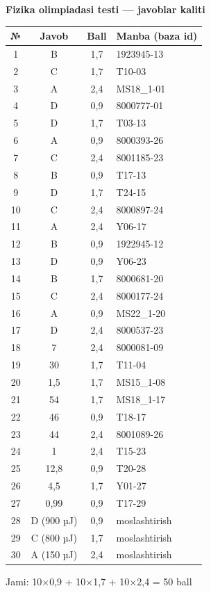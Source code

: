 \documentclass[11pt,a4paper]{article}
\begin{document}
\begin{center}{\Large\textbf{Fizika olimpiadasi testi — javoblar kaliti}}\end{center}
\begin{center}\begin{tabular}{|c|c|c|l|}\hline \textbf{№} & \textbf{Javob} & \textbf{Ball} & \textbf{Manba (baza id)}\\\hline
1 & B & 1,7 & 1923945-13\\\hline
2 & C & 1,7 & T10-03\\\hline
3 & A & 2,4 & MS18\_1-01\\\hline
4 & D & 0,9 & 8000777-01\\\hline
5 & D & 1,7 & T03-13\\\hline
6 & A & 0,9 & 8000393-26\\\hline
7 & C & 2,4 & 8001185-23\\\hline
8 & B & 0,9 & T17-13\\\hline
9 & D & 1,7 & T24-15\\\hline
10 & C & 2,4 & 8000897-24\\\hline
11 & A & 2,4 & Y06-17\\\hline
12 & B & 0,9 & 1922945-12\\\hline
13 & D & 0,9 & Y06-23\\\hline
14 & B & 1,7 & 8000681-20\\\hline
15 & C & 2,4 & 8000177-24\\\hline
16 & A & 0,9 & MS22\_1-20\\\hline
17 & D & 2,4 & 8000537-23\\\hline
18 & 7 & 2,4 & 8000081-09\\\hline
19 & 30 & 1,7 & T11-04\\\hline
20 & 1,5 & 1,7 & MS15\_1-08\\\hline
21 & 54 & 1,7 & MS18\_1-17\\\hline
22 & 46 & 0,9 & T18-17\\\hline
23 & 44 & 2,4 & 8001089-26\\\hline
24 & 1 & 2,4 & T15-23\\\hline
25 & 12,8 & 0,9 & T20-28\\\hline
26 & 4,5 & 1,7 & Y01-27\\\hline
27 & 0,99 & 0,9 & T17-29\\\hline
28 & D (900 µJ) & 0,9 & moslashtirish\\\hline
29 & C (800 µJ) & 1,7 & moslashtirish\\\hline
30 & A (150 µJ) & 2,4 & moslashtirish\\\hline
\end{tabular}\end{center}
\begin{center}Jami: 10$\times$0,9 + 10$\times$1,7 + 10$\times$2,4 = 50 ball\end{center}
\end{document}
